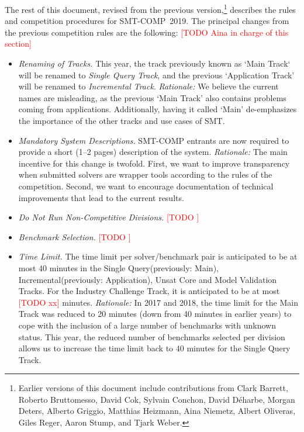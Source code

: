 \documentclass[12pt]{article}
\newcommand{\rem}[1]{\textcolor{red}{[#1]}}
\newcommand{\todo}[1]{\rem{TODO #1}}
\newcommand{\main}{Single Query\xspace}
\newcommand{\incremental}{Incremental\xspace}
\newcommand{\ucore}{Unsat Core\xspace}
\newcommand{\mval}{Model Validation\xspace}
\newcommand{\challenge}{Industry Challenge\xspace}
\begin{document}
The rest of this document, revised from the previous
version,\footnote{Earlier versions of this document include
  contributions from Clark Barrett, Roberto Bruttomesso, David Cok,
  Sylvain Conchon, David D{\'e}harbe, Morgan Deters, Alberto Griggio,
  Matthias Heizmann, Aina Niemetz, Albert Oliveras, Giles Reger, Aaron Stump,
	and Tjark Weber.}  describes the rules and competition procedures for
SMT-COMP~2019.
The principal changes from the previous competition rules are the following: \todo{Aina in charge of this section}
\begin{itemize}
  \item {\it Renaming of Tracks.} This year, the track previously known as
    `Main Track` will be renamed to \emph{\main Track}, and the previous
    `Application Track' will be renamed to \emph{\incremental Track}.
    \emph{Rationale:} We believe the current names are misleading, as the
    previous `Main Track' also contains problems coming from applications.
    Additionally, having it called `Main' de-emphasizes the importance of the
    other tracks and use cases of SMT.

  \item {\it Mandatory System Descriptions.}
    SMT-COMP entrants are now required to provide a short (1–2 pages)
    description of the system.  \emph{Rationale:} The main incentive for this
    change is twofold.  First, we want to improve transparency when submitted
    solvers are wrapper tools according to the rules of the competition.
    Second, we want to encourage documentation of technical improvements that
    lead to the current results.

  \item {\it Do Not Run Non-Competitive Divisions.} \todo{}

  \item {\it Benchmark Selection.} \todo{}

  \item {\it Time Limit.} The time limit per solver/benchmark pair is
    anticipated to be at most 40 minutes in the \main (previously: Main),
    \incremental (previously: Application), \ucore and \mval Tracks.  For the
    \challenge Track, it is anticipated to be at most \todo{xx} minutes.
    \emph{Rationale:} In 2017 and 2018, the time limit for the Main Track was
    reduced to 20 minutes (down from 40 minutes in earlier years) to cope with
    the inclusion of a large number of benchmarks with unknown status.  This
    year, the reduced number of benchmarks selected per division allows us to
    increase the time limit back to 40 minutes for the \main Track.


\end{itemize}
\end{document}
